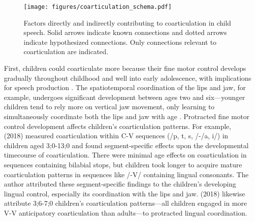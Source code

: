 \documentclass[a4paper,man,natbib,donotrepeattitle, apacite]{apa6}
\begin{document}
\begin{figure}[H]
\centering
\texttt{[image: figures/coarticulation\_schema.pdf]}
\caption{\label{fig:schema}Factors directly and indirectly contributing to coarticulation in child speech. Solid arrows indicate known connections and dotted arrows indicate hypothesized connections. Only connections relevant to coarticulation are indicated.}
\end{figure}

First, children could coarticulate more because their fine motor control develops gradually throughout childhood and well into early adolescence, with implications for speech production \cite{barbierWhatAnticipatoryCoarticulation2020,kentAnatomicalNeuromuscularMaturation1976,perkellFiveDecadesResearch2013,walshArticulatoryMovementsAdolescents2002}. The spatiotemporal coordination of the lips and jaw, for example, undergoes significant development between ages two and six---younger children tend to rely more on vertical jaw movement, only learning to simultaneously coordinate both the lips and jaw with age \cite{greenPhysiologicDevelopmentSpeech2000}. Protracted fine motor control development affects children’s coarticulation patterns. For example, \citeauthor{zharkovaUltrasoundStudyDevelopment2018} (2018) measured coarticulation within C-V sequences (/p, t, s, \textesh/-/a, i/) in children aged 3;0-13;0 and found segment-specific effects upon the developmental timecourse of coarticulation. There were minimal age effects on coarticulation in sequences containing bilabial stops, but children took longer to acquire mature coarticulation patterns in sequences like /\textesh-V/ containing lingual consonants. The author attributed these segment-specific findings to the children's developing lingual control, especially its coordination with the lips and jaw. \citeauthor{rubertusDevelopmentGesturalOrganization2018} (2018) likewise attribute 3;6-7;0 children’s coarticulation patterns---all children engaged in more V-V anticipatory coarticulation than adults---to protracted lingual coordination.           
\end{document}
